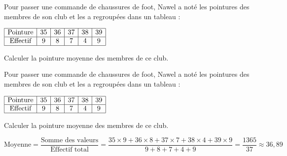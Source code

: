 \begin{exercice*}[Pointures]
    Pour passer une commande de chaussures de foot, Nawel a noté les pointures des membres de son club et les a regroupées dans un tableau :

    \medskip
    $\begin{array}{|c|c|c|c|c|c|}
        \hline
        \text{Pointure} & 35 & 36 & 37 & 38 & 39 \\\hline
        \text{Effectif} & 9 & 8 & 7 & 4 & 9 \\\hline
    \end{array}$

    \medskip
    Calculer la pointure moyenne des membres de ce club.

\end{exercice*}
\begin{corrige}
    Pour passer une commande de chaussures de foot, Nawel a noté les pointures des membres de son club et les a regroupées dans un tableau :

    \medskip
    $\begin{array}{|c|c|c|c|c|c|}
        \hline
        \text{Pointure} & 35 & 36 & 37 & 38 & 39 \\\hline
        \text{Effectif} & 9 & 8 & 7 & 4 & 9 \\\hline
    \end{array}$

    \medskip
    Calculer la pointure moyenne des membres de ce club.

    {\red
    \begin{spacing}{1.5}
        $\text{Moyenne} = \dfrac{\text{Somme des valeurs}}{\text{Effectif total}} =\dfrac{35 \times 9+ 36 \times 8+ 37 \times 7+ 38 \times 4+ 39 \times 9}{9+ 8+ 7+ 4+ 9} = \dfrac{1365}{37} \approx36{,}89$\\
    \end{spacing}
    }
\end{corrige}

